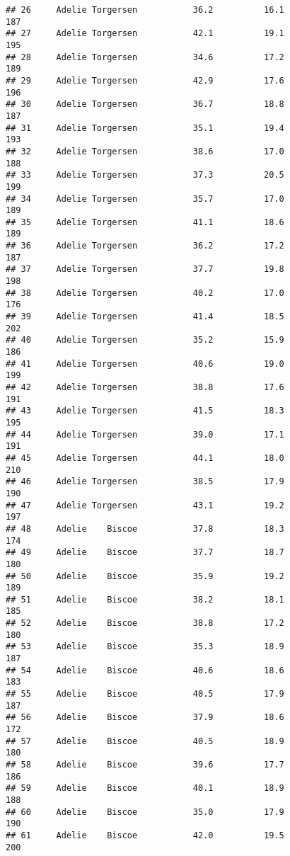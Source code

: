 \documentclass[
]{article}
\begin{document}
\begin{verbatim}
## 26     Adelie Torgersen           36.2          16.1               187
## 27     Adelie Torgersen           42.1          19.1               195
## 28     Adelie Torgersen           34.6          17.2               189
## 29     Adelie Torgersen           42.9          17.6               196
## 30     Adelie Torgersen           36.7          18.8               187
## 31     Adelie Torgersen           35.1          19.4               193
## 32     Adelie Torgersen           38.6          17.0               188
## 33     Adelie Torgersen           37.3          20.5               199
## 34     Adelie Torgersen           35.7          17.0               189
## 35     Adelie Torgersen           41.1          18.6               189
## 36     Adelie Torgersen           36.2          17.2               187
## 37     Adelie Torgersen           37.7          19.8               198
## 38     Adelie Torgersen           40.2          17.0               176
## 39     Adelie Torgersen           41.4          18.5               202
## 40     Adelie Torgersen           35.2          15.9               186
## 41     Adelie Torgersen           40.6          19.0               199
## 42     Adelie Torgersen           38.8          17.6               191
## 43     Adelie Torgersen           41.5          18.3               195
## 44     Adelie Torgersen           39.0          17.1               191
## 45     Adelie Torgersen           44.1          18.0               210
## 46     Adelie Torgersen           38.5          17.9               190
## 47     Adelie Torgersen           43.1          19.2               197
## 48     Adelie    Biscoe           37.8          18.3               174
## 49     Adelie    Biscoe           37.7          18.7               180
## 50     Adelie    Biscoe           35.9          19.2               189
## 51     Adelie    Biscoe           38.2          18.1               185
## 52     Adelie    Biscoe           38.8          17.2               180
## 53     Adelie    Biscoe           35.3          18.9               187
## 54     Adelie    Biscoe           40.6          18.6               183
## 55     Adelie    Biscoe           40.5          17.9               187
## 56     Adelie    Biscoe           37.9          18.6               172
## 57     Adelie    Biscoe           40.5          18.9               180
## 58     Adelie    Biscoe           39.6          17.7               186
## 59     Adelie    Biscoe           40.1          18.9               188
## 60     Adelie    Biscoe           35.0          17.9               190
## 61     Adelie    Biscoe           42.0          19.5               200

\end{verbatim}
\end{document}

